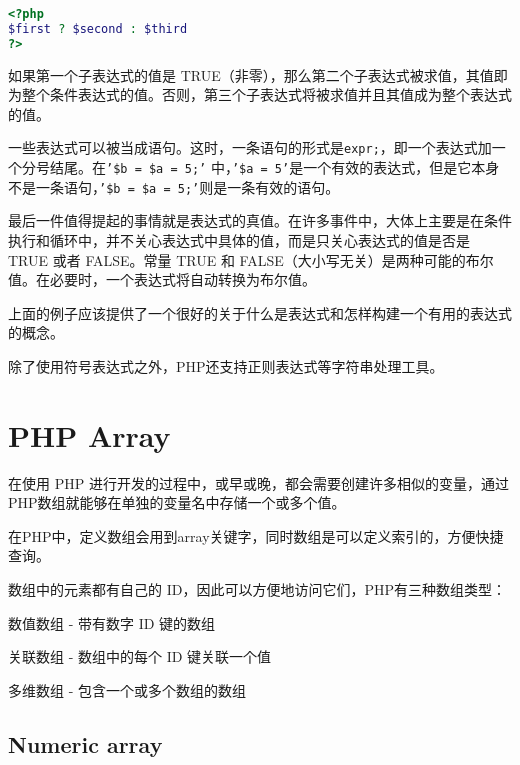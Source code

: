 \begin{lstlisting}[language=PHP]
<?php
$first ? $second : $third
?>
\end{lstlisting}

如果第一个子表达式的值是 TRUE（非零），那么第二个子表达式被求值，其值即为整个条件表达式的值。否则，第三个子表达式将被求值并且其值成为整个表达式的值。


一些表达式可以被当成语句。这时，一条语句的形式是\texttt{expr;}，即一个表达式加一个分号结尾。在\texttt{'\$b = \$a = 5;'} 中，\texttt{'\$a = 5'}是一个有效的表达式，但是它本身不是一条语句，\texttt{'\$b = \$a = 5;'}则是一条有效的语句。

最后一件值得提起的事情就是表达式的真值。在许多事件中，大体上主要是在条件执行和循环中，并不关心表达式中具体的值，而是只关心表达式的值是否是 TRUE 或者 FALSE。常量 TRUE 和 FALSE（大小写无关）是两种可能的布尔值。在必要时，一个表达式将自动转换为布尔值。

上面的例子应该提供了一个很好的关于什么是表达式和怎样构建一个有用的表达式的概念。

除了使用符号表达式之外，PHP还支持正则表达式等字符串处理工具。




\chapter{PHP Array}



在使用 PHP 进行开发的过程中，或早或晚，都会需要创建许多相似的变量，通过PHP数组就能够在单独的变量名中存储一个或多个值。

在PHP中，定义数组会用到array关键字，同时数组是可以定义索引的，方便快捷查询。

数组中的元素都有自己的 ID，因此可以方便地访问它们，PHP有三种数组类型：

\begin{compactitem}
\item 数值数组 - 带有数字 ID 键的数组

\item 关联数组 - 数组中的每个 ID 键关联一个值

\item 多维数组 - 包含一个或多个数组的数组
\end{compactitem}






\section{Numeric array}

